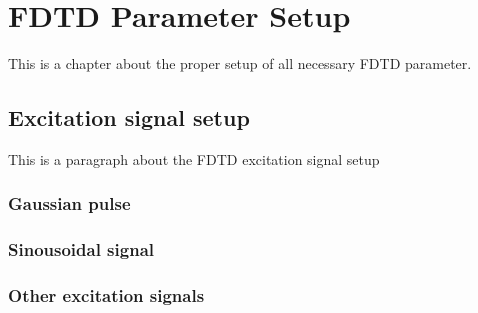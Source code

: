 \chapter{FDTD Parameter Setup}
This is a chapter about the proper setup of all necessary FDTD parameter.

\section{Excitation signal setup}
This is a paragraph about the FDTD excitation signal setup

\subsection{Gaussian pulse}

\subsection{Sinousoidal signal}

\subsection{Other excitation signals}



